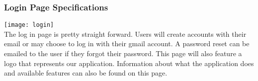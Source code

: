 \subsubsection{Login Page Specifications}
\texttt{[image: login]}\\
The log in page is pretty straight forward. Users will create accounts with their email or may choose to log in with their gmail account. A password reset can be emailed to the user if they forgot their password. This page will also feature a logo that represents our application. Information about what the application does and available features can also be found on this page.\par
